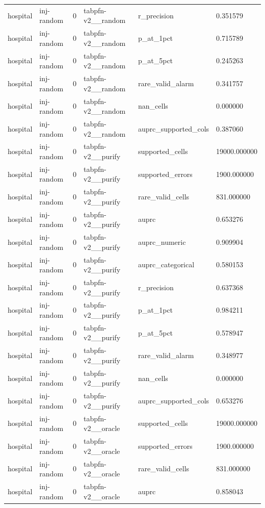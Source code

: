 \begin{tabular}{llllll}
hospital & inj-random & 0 & tabpfn-v2\_\_random & r\_precision & 0.351579 \\
hospital & inj-random & 0 & tabpfn-v2\_\_random & p\_at\_1pct & 0.715789 \\
hospital & inj-random & 0 & tabpfn-v2\_\_random & p\_at\_5pct & 0.245263 \\
hospital & inj-random & 0 & tabpfn-v2\_\_random & rare\_valid\_alarm & 0.341757 \\
hospital & inj-random & 0 & tabpfn-v2\_\_random & nan\_cells & 0.000000 \\
hospital & inj-random & 0 & tabpfn-v2\_\_random & auprc\_supported\_cols & 0.387060 \\
hospital & inj-random & 0 & tabpfn-v2\_\_purify & supported\_cells & 19000.000000 \\
hospital & inj-random & 0 & tabpfn-v2\_\_purify & supported\_errors & 1900.000000 \\
hospital & inj-random & 0 & tabpfn-v2\_\_purify & rare\_valid\_cells & 831.000000 \\
hospital & inj-random & 0 & tabpfn-v2\_\_purify & auprc & 0.653276 \\
hospital & inj-random & 0 & tabpfn-v2\_\_purify & auprc\_numeric & 0.909904 \\
hospital & inj-random & 0 & tabpfn-v2\_\_purify & auprc\_categorical & 0.580153 \\
hospital & inj-random & 0 & tabpfn-v2\_\_purify & r\_precision & 0.637368 \\
hospital & inj-random & 0 & tabpfn-v2\_\_purify & p\_at\_1pct & 0.984211 \\
hospital & inj-random & 0 & tabpfn-v2\_\_purify & p\_at\_5pct & 0.578947 \\
hospital & inj-random & 0 & tabpfn-v2\_\_purify & rare\_valid\_alarm & 0.348977 \\
hospital & inj-random & 0 & tabpfn-v2\_\_purify & nan\_cells & 0.000000 \\
hospital & inj-random & 0 & tabpfn-v2\_\_purify & auprc\_supported\_cols & 0.653276 \\
hospital & inj-random & 0 & tabpfn-v2\_\_oracle & supported\_cells & 19000.000000 \\
hospital & inj-random & 0 & tabpfn-v2\_\_oracle & supported\_errors & 1900.000000 \\
hospital & inj-random & 0 & tabpfn-v2\_\_oracle & rare\_valid\_cells & 831.000000 \\
hospital & inj-random & 0 & tabpfn-v2\_\_oracle & auprc & 0.858043 \\

\end{tabular}
